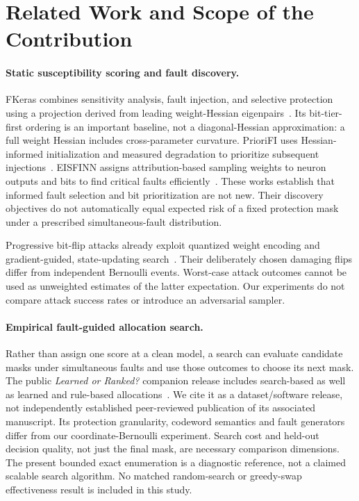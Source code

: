 \section{Related Work and Scope of the Contribution}
\paragraph{Static susceptibility scoring and fault discovery.}
FKeras combines sensitivity analysis, fault injection, and selective protection using a projection derived from leading weight-Hessian eigenpairs~\cite{weng2024fkeras}. Its bit-tier-first ordering is an important baseline, not a diagonal-Hessian approximation: a full weight Hessian includes cross-parameter curvature. PrioriFI uses Hessian-informed initialization and measured degradation to prioritize subsequent injections~\cite{weng2026priorifi}. EISFINN assigns attribution-based sampling weights to neuron outputs and bits to find critical faults efficiently~\cite{colucci2024eisfinn}. These works establish that informed fault selection and bit prioritization are not new. Their discovery objectives do not automatically equal expected risk of a fixed protection mask under a prescribed simultaneous-fault distribution.

Progressive bit-flip attacks already exploit quantized weight encoding and gradient-guided, state-updating search~\cite{rakin2019bfa}. Their deliberately chosen damaging flips differ from independent Bernoulli events. Worst-case attack outcomes cannot be used as unweighted estimates of the latter expectation. Our experiments do not compare attack success rates or introduce an adversarial sampler.

\paragraph{Empirical fault-guided allocation search.}
Rather than assign one score at a clean model, a search can evaluate candidate
masks under simultaneous faults and use those outcomes to choose its next mask.
The public \emph{Learned or Ranked?} companion release includes search-based
as well as learned and rule-based allocations~\cite{alobaidi2026selectiveeccdataset}.
We cite it as a dataset/software release, not independently established
peer-reviewed publication of its associated manuscript. Its protection
granularity, codeword semantics and fault generators differ from our
coordinate-Bernoulli experiment. Search cost and held-out decision quality,
not just the final mask, are necessary comparison dimensions. The present
bounded exact enumeration is a diagnostic reference, not a claimed scalable
search algorithm. No matched random-search or greedy-swap effectiveness result
is included in this study.

